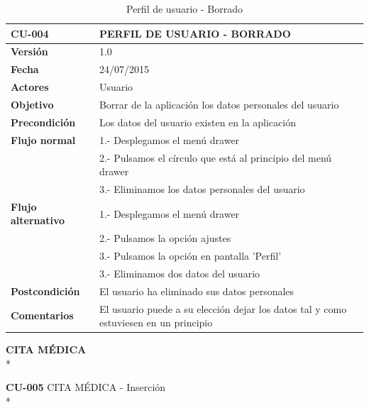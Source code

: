 \documentclass[../pfc.tex]{subfiles}
\begin{document}
	\begin{table}[H]
		\centering
		\begin{tabular}[t]{|p{3cm}|p{9.5cm}|}
			\hline \textbf{CU-004} & \textbf{PERFIL DE USUARIO - BORRADO} \\*
			\hline\hline \textbf{Versión} & 1.0 \\*
			\hline\hline \textbf{Fecha} & 24/07/2015 \\*
			\hline\textbf{Actores} 	& Usuario\\*
			\hline \textbf{Objetivo} & Borrar de la aplicación los datos personales del usuario\\* 			
			\hline \textbf{Precondición} & Los datos del usuario existen en la aplicación \\* 
			\hline \textbf{Flujo normal} & 1.- Desplegamos el menú drawer \\* 
			& 2.- Pulsamos el círculo que está al principio del menú drawer\\*	
			& 3.- Eliminamos los datos personales del usuario\\*	
			\hline \textbf{Flujo alternativo} & 1.- Desplegamos el menú drawer \\* 
			& 2.- Pulsamos la opción ajustes \\*	
			& 3.- Pulsamos la opción en pantalla 'Perfil' \\*	
			& 3.- Eliminamos dos datos del usuario\\*	
			\hline \textbf{Postcondición} & El usuario ha eliminado sus datos personales\\* 
			\hline \textbf{Comentarios}   & El usuario puede a su elección dejar los datos tal y como estuviesen en un principio\\* 
			\hline
		\end{tabular}
		\caption{Perfil de usuario - Borrado}
		\label{tabla:caso004}

	\end{table}
	
	\clearpage
	
	\textbf{CITA MÉDICA}\\*

	\textbf{CU-005}	CITA MÉDICA - Inserción\\*
	
\end{document}
